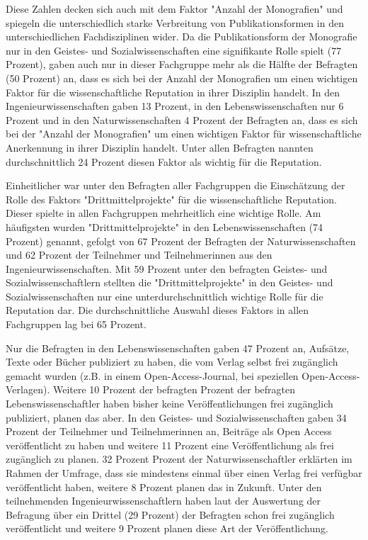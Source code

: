 Diese Zahlen decken sich auch mit dem Faktor "Anzahl der Monografien" und spiegeln die unterschiedlich starke Verbreitung von Publikationsformen in den unterschiedlichen Fachdisziplinen wider. Da die Publikationsform der Monografie nur in den Geistes- und Sozialwissenschaften eine signifikante Rolle spielt (77 Prozent), gaben auch nur in dieser Fachgruppe mehr als die Hälfte der Befragten (50 Prozent) an, dass es sich bei der Anzahl der Monografien um einen wichtigen Faktor für die wissenschaftliche Reputation in ihrer Disziplin handelt. In den Ingenieurwissenschaften gaben 13 Prozent, in den Lebenswissenschaften nur 6 Prozent und in den Naturwissenschaften 4 Prozent der Befragten an, dass es sich bei der "Anzahl der Monografien" um einen wichtigen Faktor für wissenschaftliche Anerkennung in ihrer Disziplin handelt. Unter allen Befragten nannten durchschnittlich 24 Prozent diesen Faktor als wichtig für die Reputation.

Einheitlicher war unter den Befragten aller Fachgruppen die Einschätzung der Rolle des Faktors "Drittmittelprojekte" für die wissenschaftliche Reputation. Dieser spielte in allen Fachgruppen mehrheitlich eine wichtige Rolle. Am häufigsten wurden "Drittmittelprojekte" in den Lebenswissenschaften (74 Prozent) genannt, gefolgt von 67 Prozent der Befragten der Naturwissenschaften und 62 Prozent der Teilnehmer und Teilnehmerinnen aus den Ingenieurwissenschaften. Mit 59 Prozent unter den befragten Geistes- und Sozialwissenschaftlern stellten die "Drittmittelprojekte" in den Geistes- und Sozialwissenschaften nur eine unterdurchschnittlich wichtige Rolle für die Reputation dar. Die durchschnittliche Auswahl dieses Faktors in allen Fachgruppen lag bei 65 Prozent.

Nur die Befragten in den Lebenswissenschaften gaben 47 Prozent an, Aufsätze, Texte oder Bücher publiziert zu haben, die vom Verlag selbst frei zugänglich gemacht wurden (z.B. in einem Open-Access-Journal, bei speziellen Open-Access-Verlagen). Weitere 10 Prozent der befragten Prozent der befragten Lebenswissenschaftler haben bisher keine Veröffentlichungen frei zugänglich publiziert, planen das aber. In den Geistes- und Sozialwissenschaften gaben 34 Prozent der Teilnehmer und Teilnehmerinnen an, Beiträge als Open Access veröffentlicht zu haben und weitere 11 Prozent eine Veröffentlichung als frei zugänglich zu planen. 32 Prozent Prozent der Naturwissenschaftler erklärten im Rahmen der Umfrage, dass sie mindestens einmal über einen Verlag frei verfügbar veröffentlicht haben, weitere 8 Prozent planen das in Zukunft. Unter den teilnehmenden Ingenieurwissenschaftlern haben laut der Auswertung der Befragung über ein Drittel  (29 Prozent) der Befragten schon frei zugänglich veröffentlicht und weitere 9 Prozent planen diese Art der Veröffentlichung.

